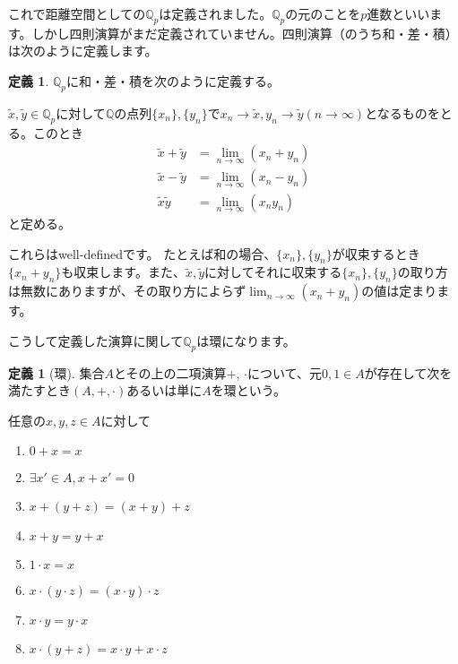 \documentclass[uplatex]{jsarticle}
\newcommand{\Q}{\mathbb{Q}}
\theoremstyle{definition} %
\newtheorem{defi}[thm]{定義}
\begin{document}
これで距離空間としての$\Q_p$は定義されました。$\Q_p$の元のことを$p$進数といいます。しかし四則演算がまだ定義されていません。四則演算（のうち和・差・積）は次のように定義します。

\begin{oframed}\begin{defi}
$\Q_p$に和・差・積を次のように定義する。

$\tilde{x}, \tilde{y} \in \Q_p$に対して$\Q$の点列$\{x_n\}, \{y_n\}$で$x_n \to \tilde{x}, y_n \to \tilde{y} (n \to \infty)$となるものをとる。このとき
\begin{align*}
\tilde{x} + \tilde{y} &= \lim_{n\to\infty} (x_n + y_n) \\
\tilde{x} - \tilde{y} &= \lim_{n\to\infty} (x_n - y_n) \\
\tilde{x} \tilde{y} &= \lim_{n\to\infty} (x_n y_n)
\end{align*}
と定める。
\end{defi}\end{oframed}

これらはwell-definedです。
たとえば和の場合、$\{x_n\}, \{y_n\}$が収束するとき$\{x_n + y_n\}$も収束します。また、$\tilde{x}, \tilde{y}$に対してそれに収束する$\{x_n\}, \{y_n\}$の取り方は無数にありますが、その取り方によらず$\lim_{n\to\infty} (x_n + y_n)$の値は定まります。

こうして定義した演算に関して$\Q_p$は環になります。

\begin{oframed}\begin{defi}[環]
集合$A$とその上の二項演算$+$, $\cdot$について、元$0, 1 \in A$が存在して次を満たすとき$(A, +, \cdot)$あるいは単に$A$を環という。

任意の$x, y, z \in A$に対して
\begin{enumerate}
\item $0 + x = x$
\item $\exists x'\in A, x + x' = 0$
\item $x + (y + z) = (x + y) + z$
\item $x + y = y + x$
\item $1 \cdot x = x$
\item $x \cdot (y \cdot z) = (x \cdot y) \cdot z$
\item $x \cdot y = y \cdot x$
\item $x \cdot (y + z) = x \cdot y + x \cdot z$
\end{enumerate}
\end{defi}\end{oframed}
\end{document}
